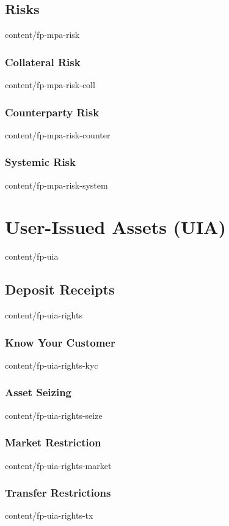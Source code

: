 \documentclass[conference,final,10pt,a4paper]{IEEEtran}
\begin{document}
\subsection    { Risks                                           }  { content/fp-mpa-risk            } 
\subsubsection { Collateral Risk                                 }  { content/fp-mpa-risk-coll       } 
\subsubsection { Counterparty Risk                               }  { content/fp-mpa-risk-counter    } 
\subsubsection { Systemic Risk                                   }  { content/fp-mpa-risk-system     } 

\section       { User-Issued Assets (UIA)                        }  { content/fp-uia                 } 
\subsection    { Deposit Receipts                                }  { content/fp-uia-rights          } 
\subsubsection { Know Your Customer                              }  { content/fp-uia-rights-kyc      } 
\subsubsection { Asset Seizing                                   }  { content/fp-uia-rights-seize    } 
\subsubsection { Market Restriction                              }  { content/fp-uia-rights-market   } 
\subsubsection { Transfer Restrictions                           }  { content/fp-uia-rights-tx       } 
\end{document}

